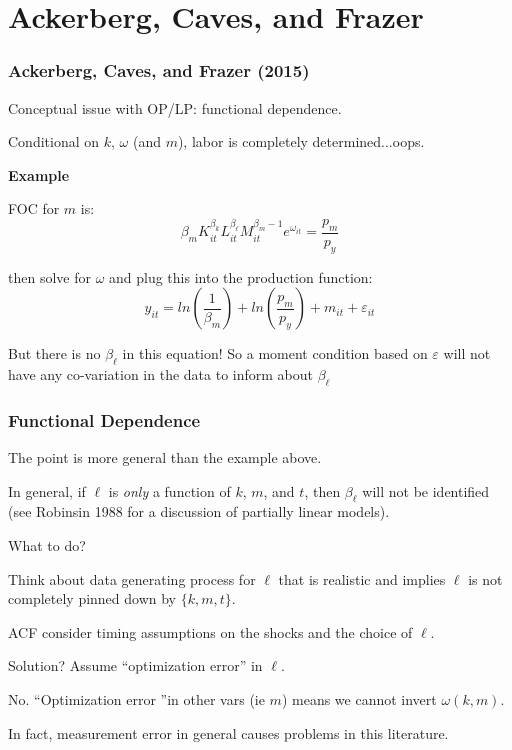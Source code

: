 \documentclass[11pt, aspectratio=169]{beamer}
\newenvironment{wideitemize}{\itemize\addtolength{\itemsep}{10pt}}{\enditemize}
\begin{document}


\section[ACF]{Ackerberg, Caves, and Frazer} %
\label{sec:ackerberg_caves_and_frazer}


\begin{frame}[c]\frametitle{Ackerberg, Caves, and Frazer (2015)}
    
Conceptual issue with OP/LP: functional dependence.
\begin{wideitemize}
    \item Conditional on $k$, $\omega$ (and $m$), labor is completely determined...oops.
\end{wideitemize}
        
\textbf{Example}        
\begin{wideitemize}
	\item FOC for $m$ is:
	$$\beta_m K_{it}^{\beta_k}L_{it}^{\beta_{\ell}}M_{it}^{\beta_m-1}e^{\omega_{it}} = \frac{p_m}{p_y}$$
	\item then solve for $\omega$ and plug this into the production function:
	$$y_{it} = ln(\frac{1}{\beta_m}) + ln(\frac{p_m}{p_y}) + m_{it} + \varepsilon_{it}$$
	\item But there is no $\beta_{\ell}$ in this equation! So a moment condition based on $\varepsilon$ will not have any co-variation in the data to inform about $\beta_{\ell}$
\end{wideitemize}


\end{frame}


\begin{frame}[c]\frametitle{Functional Dependence}

The point is more general than the example above. 
\begin{wideitemize}
	\item In general, if $\ell$ is \emph{only} a function of $k$, $m$, and $t$, then $\beta_{\ell}$ will not be identified (see Robinsin 1988 for a discussion of partially linear models). 
\end{wideitemize}

\bigskip
What to do?
\begin{wideitemize}
	\item Think about data generating process for $\ell$ that is realistic and implies $\ell$ is not completely pinned down by $\{k,m,t\}$.
	\item ACF consider timing assumptions on the shocks and the choice of $\ell$.
	\item Solution? Assume ``optimization error'' in $\ell$.
	\begin{wideitemize}
		\item No. ``Optimization error ''in other vars (ie $m$) means we cannot invert $\omega(k,m)$.
		\item In fact, measurement error in general causes problems in this literature. 
	\end{wideitemize}
	
\end{wideitemize}


\end{frame}
\end{document}
